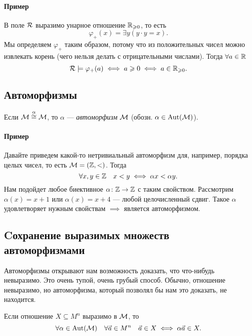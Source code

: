 \paragraph{Пример}
В поле $\mathcal{R}$ выразимо унарное отношение $\mathbb{R}_{\geqslant 0}$, то есть
$$
    \varphi_{+}(x) = \exists y (y \cdot y = x).
$$
Мы определяем $\varphi_{+}$ таким образом, потому что из положительных чисел можно извлекать корень (чего нельзя делать с отрицательными числами).
Тогда $\forall a \in \mathbb{R}$
$$
    \mathcal{R} \models \varphi_{+}(a) \iff a \geqslant 0 \iff a\in \mathbb{R}_{\geqslant 0}.
$$

\subsection{Автоморфизмы}

\begin{definition}
    Если $\mathcal{M} \overset{\alpha}{\cong} \mathcal{M}$, то $\alpha$ --- {\it автоморфизм} $\mathcal{M}$ (обозн. $\alpha \in \operatorname{Aut}(\mathcal{M})$).
\end{definition}

\paragraph{Пример}
Давайте приведем какой-то нетривиальный автоморфизм для, например, порядка целых чисел, то есть $\mathcal{M} = (\mathbb{Z}, <)$.
Тогда
$$
    \forall x, y \in \mathbb{Z} \quad x < y \iff \alpha x < \alpha y.
$$
Нам подойдет любое биективное $\alpha \colon \mathbb{Z} \to \mathbb{Z}$ с таким свойством.
Рассмотрим $\alpha(x) = x + 1$ или $\alpha(x) = x + 4$ --- любой целочисленный сдвиг.
Такое $\alpha$ удовлетворяет нужным свойствам $\implies$ является автоморфизмом.

\subsection{Cохранение выразимых множеств автоморфизмами}

Автоморфизмы открывают нам возможность доказать, что что-нибудь невыразимо.
Это очень тупой, очень грубый способ.
Обычно, отношение невыразимо, но автоморфизма, который позволял бы нам это доказать, не находится.

\begin{corollary}
    Если отношение $X \subseteq M^{n}$ выразимо в $\mathcal{M}$, то
    $$
        \forall \alpha \in \operatorname{Aut}(\mathcal{M}) \quad \forall \vec{a} \in M^{n} \quad \vec{a} \in X \iff \alpha \vec{a} \in X.
    $$
\end{corollary}

